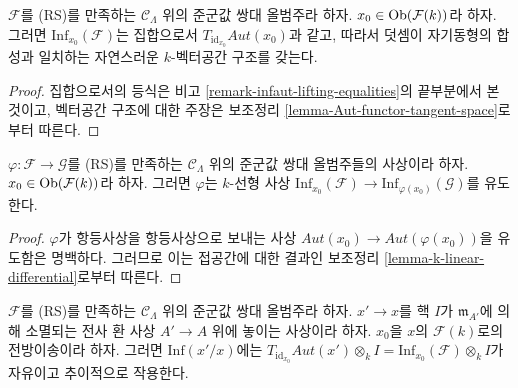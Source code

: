 \begin{lemma}
\label{lemma-infaut-vector-space}
$\mathcal{F}$를 (RS)를 만족하는 $\mathcal{C}_\Lambda$ 위의 준군값 쌍대
올범주라 하자. $x_0 \in \mathop{\mathrm{Ob}}\nolimits(\mathcal{F}(k))$라 하자. 그러면
$\text{Inf}_{x_0}(\mathcal{F})$는 집합으로서
$T_{\text{id}_{x_0}} \mathit{Aut}(x_0)$과 같고, 따라서 덧셈이
자기동형의 합성과 일치하는 자연스러운 $k$-벡터공간 구조를 갖는다.
\end{lemma}

\begin{proof}
집합으로서의 등식은 비고 \ref{remark-infaut-lifting-equalities}의
끝부분에서 본 것이고, 벡터공간 구조에 대한 주장은 보조정리
\ref{lemma-Aut-functor-tangent-space}로부터 따른다.
\end{proof}

\begin{lemma}
\label{lemma-k-linear-infaut}
$\varphi : \mathcal{F} \to \mathcal{G}$를 (RS)를 만족하는
$\mathcal{C}_\Lambda$ 위의 준군값 쌍대 올범주들의 사상이라 하자.
$x_0 \in \mathop{\mathrm{Ob}}\nolimits(\mathcal{F}(k))$라 하자. 그러면 $\varphi$는 $k$-선형 사상
$\text{Inf}_{x_0}(\mathcal{F}) \to \text{Inf}_{\varphi(x_0)}(\mathcal{G})$를
유도한다.
\end{lemma}

\begin{proof}
$\varphi$가 항등사상을 항등사상으로 보내는 사상
$\mathit{Aut}(x_0) \to \mathit{Aut}(\varphi(x_0))$을 유도함은 명백하다.
그러므로 이는 접공간에 대한 결과인 보조정리
\ref{lemma-k-linear-differential}로부터 따른다.
\end{proof}

\begin{lemma}
\label{lemma-lifted-automorphisms-torsor}
$\mathcal{F}$를 (RS)를 만족하는 $\mathcal{C}_\Lambda$ 위의 준군값 쌍대
올범주라 하자. $x' \to x$를 핵 $I$가 $\mathfrak m_{A'}$에 의해
소멸되는 전사 환 사상 $A' \to A$ 위에 놓이는 사상이라 하자.
$x_0$을 $x$의 $\mathcal{F}(k)$로의 전방이송이라 하자. 그러면
$\text{Inf}(x'/x)$에는
$T_{\text{id}_{x_0}} \mathit{Aut}(x') \otimes_k I
= \text{Inf}_{x_0}(\mathcal{F}) \otimes_k I$가 자유이고 추이적으로
작용한다.
\end{lemma}

